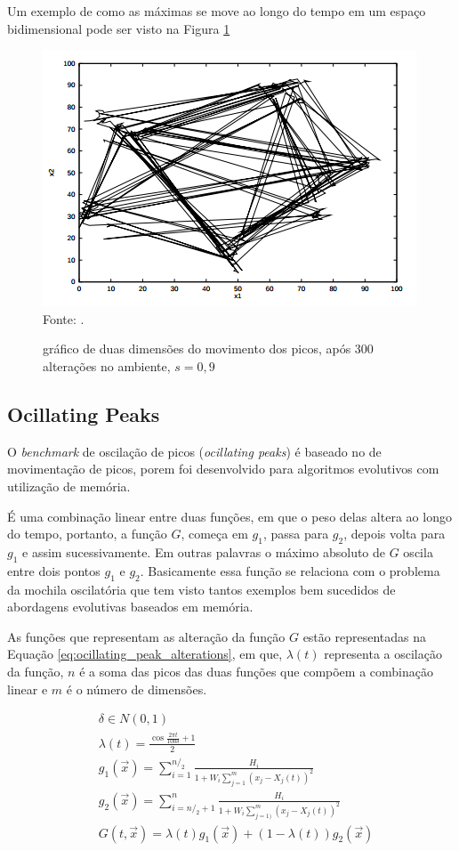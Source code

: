 Um exemplo de como as máximas se move ao longo do tempo em um espaço bidimensional pode ser visto na Figura \ref{fig:moving_peaks}

\begin{figure}[!htb]
	\caption{gráfico de duas dimensões do movimento dos picos, após 300 alterações no ambiente, $ s = 0,9 $}
	\centering
	\includegraphics[scale=0.5]{images/moving_peak.png}
	\label{fig:moving_peaks}{\\Fonte: .}
\end{figure}

\subsection{Ocillating Peaks}

O \textit{benchmark} de oscilação de picos (\textit{ocillating peaks}) é baseado no de movimentação de picos, porem foi desenvolvido para algoritmos evolutivos com utilização de memória.

É uma combinação linear entre duas funções, em que o peso delas altera ao longo do tempo, portanto, a função $G$, começa em $g_1$, passa para $g_2$, depois volta para $g_1$ e assim sucessivamente. Em outras palavras o máximo absoluto de $G$ oscila entre dois pontos $g_1$ e $g_2$. Basicamente essa função se relaciona com o problema da mochila oscilatória que tem visto tantos exemplos bem sucedidos de abordagens evolutivas baseados em memória.

As funções que representam as alteração da função $G$ estão representadas na Equação \ref{eq:ocillating_peak_alterations}, em que, $\lambda (t)$ representa a oscilação da função, $n$ é a soma das picos das duas funções que compõem a combinação linear e $m$ é o número de dimensões.

\begin{equation}
\label{eq:ocillating_peak_alterations}
\begin{split}
& \delta \in N(0,1) \\
& \lambda (t) = \frac{\cos{\frac{2\pi t}{100\delta}} +1}{2} \\
& g_1(\vec{x}) = \sum_{i=1}^{n/_2} \frac{H_i}{1+W_i \sum_{j=1}^{m} (x_j - X_j(t))^2} \\
& g_2(\vec{x}) = \sum_{i=n/_2+1}^{n} \frac{H_i}{1+W_i \sum_{j=1)}^{m} (x_j - X_j(t))^2} \\
& G(t,\vec{x}) = \lambda (t) g_1(\vec{x}) + (1-\lambda (t))g_2(\vec{x})
\end{split}
\end{equation}

